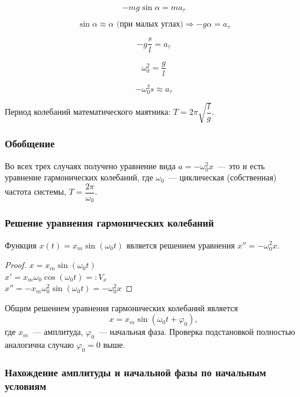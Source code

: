 \documentclass[12pt]{article}
\begin{document}
	\[ -mg\sin\alpha = ma_{\tau} \]
	
	\[ \sin\alpha \approx \alpha \text{ (при малых углах)} \Rightarrow -g\alpha = a_{\tau} \]
	
	\[ -g\dfrac{s}{l} = a_{\tau} \]
	
	\[ \omega_0^2 = \dfrac{g}{l} \]
	
	\[ -\omega_0^2 s \approx a_{\tau} \]
	
	\begin{statement}
		Период колебаний математического маятника: $T = 2\pi \sqrt{\dfrac{l}{g}}$.
	\end{statement}
	
	\subsubsection{Обобщение}
	
	\begin{statement}
		Во всех трех случаях получено уравнение вида $a = -\omega_0^2 x$~--- это и есть уравнение гармонических колебаний, где $\omega_0$~--- циклическая (собственная) частота системы, $T = \dfrac{2\pi}{\omega_0}$.
	\end{statement}
	
    \subsubsection{Решение уравнения гармонических колебаний}
    
    \begin{statement}
    	Функция $x(t) = x_m \sin (\omega_0 t)$ является решением уравнения $x'' = -\omega_0^2 x$.
    \end{statement}
    \begin{proof}
    	$x = x_m \sin (\omega_0 t)$ \\
    	$x' = x_m \omega_0 \cos (\omega_0 t) =: V_x$ \\
    	$x'' = -x_m \omega_0^2 \sin (\omega_0 t) = -\omega_0^2 x$
    \end{proof}
    
    \begin{statement}
    	Общим решением уравнения гармонических колебаний является
    	$$x = x_m \sin (\omega_0 t + \varphi_0),$$
    	где $x_m$~--- амплитуда, $\varphi_0$~--- начальная фаза. Проверка подстановкой полностью аналогична случаю $\varphi_0 = 0$ выше.
    \end{statement}
    
    \subsubsection{Нахождение амплитуды и начальной фазы по начальным условиям}
    
\end{document}
